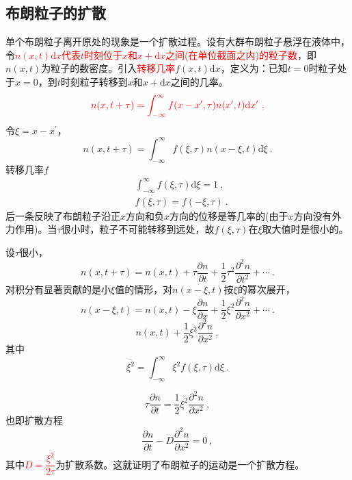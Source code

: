 \documentclass[11pt,a4paper]{article}
\newcommand{\dif}{\mathrm{d}}
\begin{document}
\subsection{布朗粒子的扩散}
\cite{2007热力学与统计物理学} 单个布朗粒子离开原处的现象是一个扩散过程。设有大群布朗粒子悬浮在液体中，令\textcolor{red}{$n(x, t)\dif x$代表$t$时刻位于$x$和$x+\dif x$之间(在单位截面之内)的粒子数}，即$n(x, t)$为粒子的数密度。引入\textcolor{red}{转移几率}$f(x, t)\dif x$，定义为：已知$t=0$时粒子处于$x=0$，到$t$时刻粒子转移到$x$和$x+\dif x$之间的几率。
\begin{equation}
\color{red} n(x, t+\tau) = \int_{-\infty}^\infty f(x-x^\prime, \tau) n(x^\prime, t)\dif x^\prime ~,
\end{equation}
令$\xi= x-x^\prime$，
\begin{equation}
n(x, t+\tau) = \int_{-\infty}^\infty f(\xi, \tau) n(x-\xi, t)\dif \xi ~.
\end{equation}
转移几率$f$
\begin{align}
& \int_{-\infty}^\infty f(\xi, \tau) \dif \xi = 1 ~, \\
& f(\xi, \tau) = f(-\xi, \tau) ~.
\end{align}
后一条反映了布朗粒子沿正$x$方向和负$x$方向的位移是等几率的(由于$x$方向没有外力作用)。当$\tau$很小时，粒子不可能转移到远处，故$f(\xi, \tau)$在$\xi$取大值时是很小的。

设$\tau$很小，
\begin{equation}
n(x, t+\tau) = n(x,t) + \tau\dfrac{\partial n}{\partial t} +\dfrac{1}{2} \tau^2 \dfrac{\partial^2 n}{\partial t^2} + \cdots ~.
\end{equation}
对积分有显著贡献的是小$\xi$值的情形，对$n(x-\xi, t)$按$\xi$的幂次展开，
\begin{equation}
n(x-\xi, t) = n(x,t) - \xi\dfrac{\partial n}{\partial x} +\dfrac{1}{2} \xi^2 \dfrac{\partial^2 n}{\partial x^2} + \cdots ~.
\end{equation}
\begin{equation}
n(x,t) +\dfrac{1}{2} \overline{\xi^2} \dfrac{\partial^2 n}{\partial x^2}  ~,
\end{equation}
其中
\begin{equation}
\overline{\xi^2} = \int_{-\infty}^\infty \xi^2 f(\xi, \tau) \dif \xi ~.
\end{equation}

\begin{equation}
\tau \dfrac{\partial n}{\partial t} = \dfrac{1}{2} \overline{\xi^2} \dfrac{\partial^2 n}{\partial x^2}  ~,
\end{equation}
也即扩散方程
\begin{equation}
\dfrac{\partial n}{\partial t} - D\dfrac{\partial^2 n}{\partial x^2} = 0 ~,
\end{equation}
其中\textcolor{red}{$D = \dfrac{\overline{\xi^2}}{2\tau}$}为扩散系数。这就证明了布朗粒子的运动是一个扩散方程。
\end{document}
